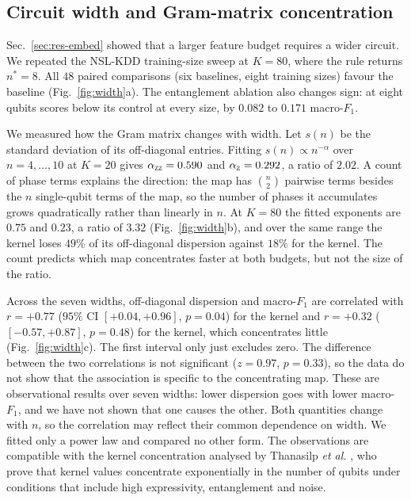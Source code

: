 \subsection{Circuit width and Gram-matrix concentration}\label{sec:res-width}



Sec.~\ref{sec:res-embed} showed that a larger feature budget requires a wider circuit. We
repeated the NSL-KDD training-size sweep at $K=80$, where the rule returns $n^{\ast}=8$. All $48$
paired comparisons (six baselines, eight training sizes) favour the baseline
(Fig.~\ref{fig:width}a). The entanglement ablation also changes sign: at eight qubits \QSVM{}
scores below its \Zmap{} control at every size, by $0.082$ to $0.171$ macro-$F_1$.

We measured how the Gram matrix changes with width. Let $s(n)$ be the standard deviation of
its off-diagonal entries. Fitting $s(n)\propto n^{-\alpha}$ over $n=4,\dots,10$ at $K=20$ gives
$\alpha_{\textsc{zz}}=0.590$ and $\alpha_{\textsc{z}}=0.292$, a ratio of $2.02$. A count of phase terms
explains the direction: the \ZZ{} map has $\binom{n}{2}$ pairwise terms besides the $n$
single-qubit terms of the \Zmap{} map, so the number of phases it accumulates grows
quadratically rather than linearly in $n$. At $K=80$ the fitted exponents are $0.75$ and
$0.23$, a ratio of $3.32$ (Fig.~\ref{fig:width}b), and over the same range the \ZZ{} kernel loses
$49\%$ of its off-diagonal dispersion against $18\%$ for the \Zmap{} kernel. The count predicts
which map concentrates faster at both budgets, but not the size of the ratio.

Across the seven widths, off-diagonal dispersion and macro-$F_1$ are correlated with $r=+0.77$
($95\%$ CI $[+0.04,+0.96]$, $p=0.04$) for the \ZZ{} kernel and $r=+0.32$ ($[-0.57,+0.87]$,
$p=0.48$) for the \Zmap{} kernel, which concentrates little (Fig.~\ref{fig:width}c). The first
interval only just excludes zero. The difference between the two correlations is not
significant ($z=0.97$, $p=0.33$), so the data do not show that the association is specific to
the concentrating map. These are observational results over seven widths: lower dispersion
goes with lower macro-$F_1$, and we have not shown that one causes the other. Both quantities
change with $n$, so the correlation may reflect their common dependence on width. We fitted
only a power law and compared no other form. The observations are
compatible with the kernel concentration analysed by Thanasilp \emph{et al.}
\cite{thanasilp2024}, who prove that kernel values concentrate exponentially in the number of
qubits under conditions that include high expressivity, entanglement and noise.

